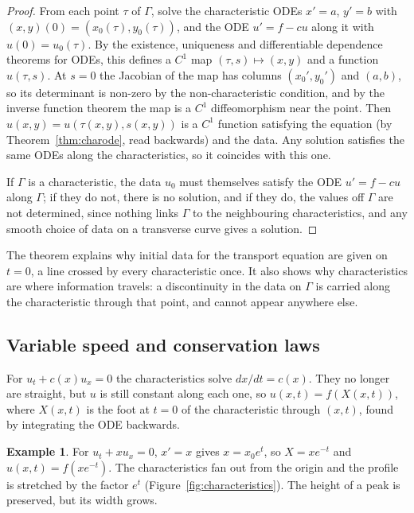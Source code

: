 \documentclass[11pt,a4paper]{article}
\numberwithin{equation}{section}
\theoremstyle{definition}
\newtheorem{exa}[thm]{Example}
\begin{document}
\begin{proof}
From each point $\tau$ of $\Gamma$, solve the characteristic ODEs $x' = a$, $y' = b$ with $(x, y)(0) = (x_0(\tau), y_0(\tau))$, and the ODE $u' = f - cu$ along it with $u(0) = u_0(\tau)$. By the existence, uniqueness and
differentiable dependence theorems for ODEs, this defines a $C^1$ map $(\tau, s) \mapsto (x, y)$ and a function $u(\tau, s)$. At $s = 0$ the Jacobian of the map has columns $(x_0', y_0')$ and $(a, b)$, so its determinant is non-zero by the
non-characteristic condition, and by the inverse function theorem the map is a $C^1$ diffeomorphism near the point. Then $u(x, y) = u(\tau(x, y), s(x, y))$ is a $C^1$ function satisfying the equation (by Theorem~\ref{thm:charode},
read backwards) and the data. Any solution satisfies the same ODEs along the characteristics, so it coincides with this one.

If $\Gamma$ is a characteristic, the data $u_0$ must themselves satisfy the ODE $u' = f - cu$ along $\Gamma$; if they do not, there is no solution, and if they do, the values off $\Gamma$ are not determined, since
nothing links $\Gamma$ to the neighbouring characteristics, and any smooth choice of data on a transverse curve gives a solution.
\end{proof}

The theorem explains why initial data for the transport equation are given on $t = 0$, a line crossed by every characteristic once. It also shows why characteristics are where information
travels: a discontinuity in the data on $\Gamma$ is carried along the characteristic through that point, and cannot appear anywhere else.

\subsection{Variable speed and conservation laws}
\label{ssec:varspeed}

For $u_t + c(x)u_x = 0$ the characteristics solve $dx/dt = c(x)$. They no longer are straight, but $u$ is still constant along each one, so $u(x, t) = f(X(x, t))$, where $X(x, t)$ is the foot at $t = 0$ of the characteristic
through $(x, t)$, found by integrating the ODE backwards.

\begin{exa}
\label{ex:stretch}
For $u_t + xu_x = 0$, $x' = x$ gives $x = x_0e^t$, so $X = xe^{-t}$ and $u(x, t) = f(xe^{-t})$. The characteristics fan out from the origin and the profile is stretched by the factor $e^t$ (Figure~\ref{fig:characteristics}). The
height of a peak is preserved, but its width grows.
\end{exa}
\end{document}
